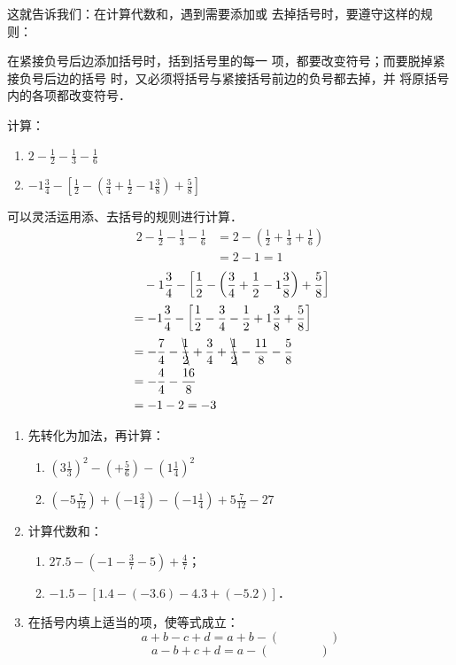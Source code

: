 这就告诉我们：在计算代数和，遇到需要添加或
去掉括号时，要遵守这样的规则：

\begin{blk}{}
	在紧接负号后边添加括号时，括到括号里的每一
	项，都要改变符号；而要脱掉紧接负号后边的括号
	时，又必须将括号与紧接括号前边的负号都去掉，并
	将原括号内的各项都改变符号．
\end{blk}



\begin{example}
	计算：
	\begin{enumerate}
		\item $2-\frac{1}{2}-\frac{1}{3}-\frac{1}{6}$
		\item $-1\frac{3}{4}-\left[\frac{1}{2}-\left(\frac{3}{4}+\frac{1}{2}-1\frac{3}{8}\right)+\frac{5}{8}\right]$
	\end{enumerate}
\end{example}

\begin{solution}
	可以灵活运用添、去括号的规则进行计算．
	\[ \begin{split}
	2-\frac{1}{2}-\frac{1}{3}-\frac{1}{6}&=2-\left(\frac{1}{2}+\frac{1}{3}+\frac{1}{6}\right)\\
	&=2-1=1
	\end{split}  \]
	\[ \begin{split}
	&\quad -1\frac{3}{4}-\left[\frac{1}{2}-\left(\frac{3}{4}+\frac{1}{2}-1\frac{3}{8}\right)+\frac{5}{8}\right]\\
	&=-1\frac{3}{4}-\left[\frac{1}{2}-\frac{3}{4}-\frac{1}{2}+1\frac{3}{8}+\frac{5}{8}\right]\\
	&=-\frac{7}{4}-\bcancel{\frac{1}{2}}+\frac{3}{4}+\bcancel{\frac{1}{2}}-\frac{11}{8}-\frac{5}{8}\\
	&=-\frac{4}{4}-\frac{16}{8}\\
	&=-1-2=-3
	\end{split}  \]
\end{solution}

\begin{ex}
	\begin{enumerate}
		\item 先转化为加法，再计算：
		\begin{enumerate}
			\item $\left(3\frac{1}{3}\right)^2-\left(+\frac{5}{6}\right)-\left(1\frac{1}{4}\right)^2$
			\item $\left(-5\frac{7}{12}\right)+\left(-1\frac{3}{4}\right)-\left(-1\frac{1}{4}\right)+5\frac{7}{12}-27$
		\end{enumerate}
		\item 计算代数和：
		\begin{enumerate}
			\item $27.5-\left(-1-\frac{3}{7}-5\right)+\frac{4}{7}$；
			\item $-1.5-[1.4-(-3.6)-4.3+(-5.2)]$．
		\end{enumerate}
		\item 在括号内填上适当的项，使等式成立：
		\[a+b-c+d=a+b-(\qquad \qquad )\]
		\[ a-b+c+d=a-(\qquad \qquad )     \]
	\end{enumerate}    
\end{ex}


